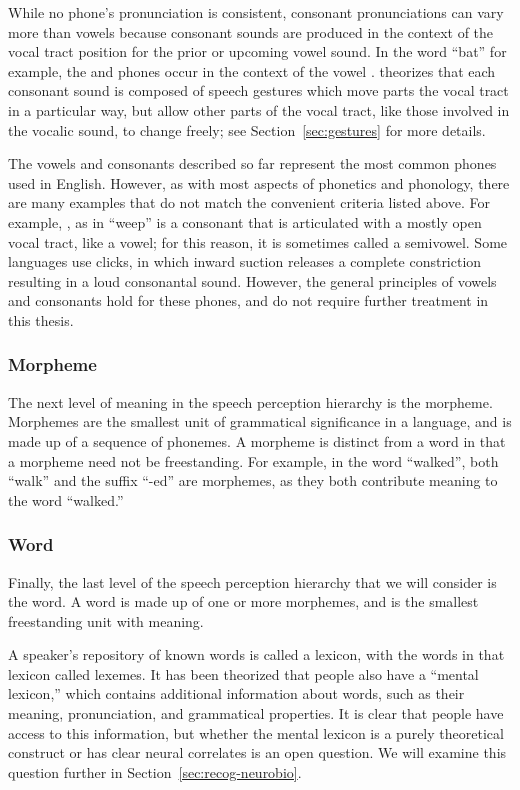 While no phone's pronunciation is consistent,
consonant pronunciations can vary more than vowels
because consonant sounds are produced in the context
of the vocal tract position for
the prior or upcoming vowel sound.
In the word ``bat'' for example,
the \ipa{[b]} and \ipa{[t]} phones
occur in the context of the vowel \ipa{[\ae]}.
\citet{kroger1993} theorizes that
each consonant sound is composed
of speech gestures which move parts
the vocal tract in a particular way,
but allow other parts of the vocal tract,
like those involved in the vocalic sound,
to change freely;
see Section~\ref{sec:gestures}
for more details.

The vowels and consonants described so far
represent the most common phones used
in English.
However, as with most aspects
of phonetics and phonology,
there are many examples that do not
match the convenient criteria listed above.
For example, \ipa{[w]}, as in ``weep''
is a consonant that is articulated
with a mostly open vocal tract,
like a vowel;
for this reason, it is sometimes called a semivowel.
Some languages use clicks,
in which inward suction releases a complete constriction
resulting in a loud consonantal sound.
However, the general principles
of vowels and consonants hold
for these phones,
and do not require further treatment
in this thesis.

\subsubsection{Morpheme}

The next level of meaning in the
speech perception hierarchy
is the morpheme.
Morphemes are the smallest unit
of grammatical significance
in a language,
and is made up of a sequence
of phonemes.
A morpheme is distinct
from a word in that
a morpheme need not be freestanding.
For example, in the word
``walked'', both ``walk''
and the suffix ``-ed''
are morphemes,
as they both contribute
meaning to the word ``walked.''

\subsubsection{Word}

Finally, the last level
of the speech perception hierarchy
that we will consider is the word.
A word is made up of
one or more morphemes,
and is the smallest freestanding unit
with meaning.

A speaker's repository of known words
is called a lexicon,
with the words in that lexicon
called lexemes.
It has been theorized that
people also have a ``mental lexicon,''
which contains additional information
about words,
such as their meaning, pronunciation,
and grammatical properties.
It is clear that people have access
to this information,
but whether the mental lexicon
is a purely theoretical construct
or has clear neural correlates
is an open question.
We will examine this question
further in Section~\ref{sec:recog-neurobio}.

